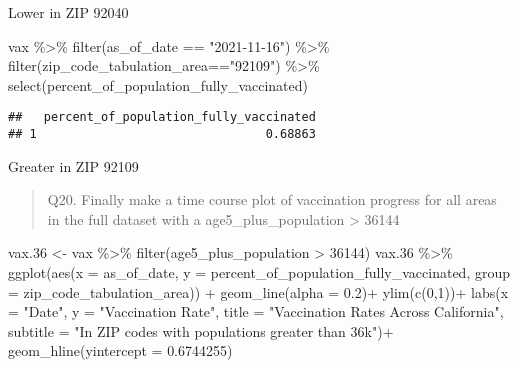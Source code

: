 \documentclass[
]{article}
\newenvironment{Shaded}{\begin{snugshade}}{\end{snugshade}}
\newcommand{\AttributeTok}[1]{\textcolor[rgb]{0.77,0.63,0.00}{#1}}
\newcommand{\DecValTok}[1]{\textcolor[rgb]{0.00,0.00,0.81}{#1}}
\newcommand{\FloatTok}[1]{\textcolor[rgb]{0.00,0.00,0.81}{#1}}
\newcommand{\FunctionTok}[1]{\textcolor[rgb]{0.00,0.00,0.00}{#1}}
\newcommand{\NormalTok}[1]{#1}
\newcommand{\OtherTok}[1]{\textcolor[rgb]{0.56,0.35,0.01}{#1}}
\newcommand{\SpecialCharTok}[1]{\textcolor[rgb]{0.00,0.00,0.00}{#1}}
\newcommand{\StringTok}[1]{\textcolor[rgb]{0.31,0.60,0.02}{#1}}
\begin{document}
Lower in ZIP 92040

\begin{Shaded}
\begin{Highlighting}[]
\NormalTok{vax }\SpecialCharTok{\%\textgreater{}\%} \FunctionTok{filter}\NormalTok{(as\_of\_date }\SpecialCharTok{==} \StringTok{"2021{-}11{-}16"}\NormalTok{) }\SpecialCharTok{\%\textgreater{}\%}  
  \FunctionTok{filter}\NormalTok{(zip\_code\_tabulation\_area}\SpecialCharTok{==}\StringTok{"92109"}\NormalTok{) }\SpecialCharTok{\%\textgreater{}\%}
  \FunctionTok{select}\NormalTok{(percent\_of\_population\_fully\_vaccinated)}
\end{Highlighting}
\end{Shaded}

\begin{verbatim}
##   percent_of_population_fully_vaccinated
## 1                                0.68863
\end{verbatim}

Greater in ZIP 92109

\begin{quote}
Q20. Finally make a time course plot of vaccination progress for all
areas in the full dataset with a age5\_plus\_population \textgreater{}
36144
\end{quote}

\begin{Shaded}
\begin{Highlighting}[]
\NormalTok{vax}\FloatTok{.36} \OtherTok{\textless{}{-}}\NormalTok{ vax }\SpecialCharTok{\%\textgreater{}\%} 
  \FunctionTok{filter}\NormalTok{(age5\_plus\_population }\SpecialCharTok{\textgreater{}} \DecValTok{36144}\NormalTok{) }
\NormalTok{vax}\FloatTok{.36} \SpecialCharTok{\%\textgreater{}\%} 
  \FunctionTok{ggplot}\NormalTok{(}\FunctionTok{aes}\NormalTok{(}\AttributeTok{x =}\NormalTok{ as\_of\_date,  }\AttributeTok{y =}\NormalTok{ percent\_of\_population\_fully\_vaccinated, }\AttributeTok{group =}\NormalTok{ zip\_code\_tabulation\_area)) }\SpecialCharTok{+}
  \FunctionTok{geom\_line}\NormalTok{(}\AttributeTok{alpha =} \FloatTok{0.2}\NormalTok{)}\SpecialCharTok{+}
  \FunctionTok{ylim}\NormalTok{(}\FunctionTok{c}\NormalTok{(}\DecValTok{0}\NormalTok{,}\DecValTok{1}\NormalTok{))}\SpecialCharTok{+}
  \FunctionTok{labs}\NormalTok{(}\AttributeTok{x =} \StringTok{"Date"}\NormalTok{, }\AttributeTok{y =} \StringTok{"Vaccination Rate"}\NormalTok{, }\AttributeTok{title =} \StringTok{"Vaccination Rates Across California"}\NormalTok{, }\AttributeTok{subtitle =} \StringTok{"In ZIP codes with populations greater than 36k"}\NormalTok{)}\SpecialCharTok{+}
  \FunctionTok{geom\_hline}\NormalTok{(}\AttributeTok{yintercept =} \FloatTok{0.6744255}\NormalTok{)}
\end{Highlighting}
\end{Shaded}
\end{document}
